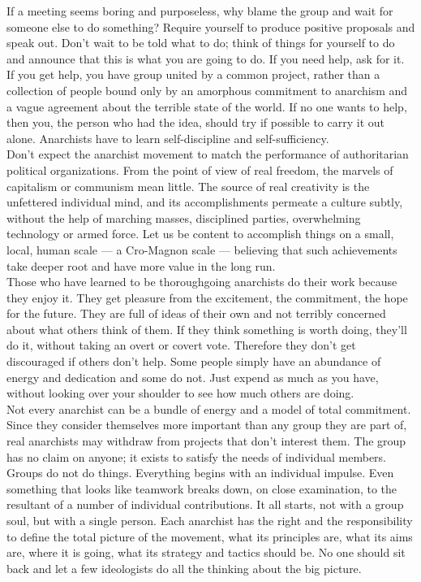 \documentclass[12pt, onecolumn, letterpaper, oneside]{book}
\begin{document}
If a meeting seems boring and purposeless, why blame the group and wait for someone else to do something? Require yourself to produce positive proposals and speak out. Don't wait to be told what to do; think of things for yourself to do and announce that this is what you are going to do. If you need help, ask for it. If you get help, you have group united by a common project, rather than a collection of people bound only by an amorphous commitment to anarchism and a vague agreement about the terrible state of the world. If no one wants to help, then you, the person who had the idea, should try if possible to carry it out alone. Anarchists have to learn self-discipline and self-sufficiency.\\
Don't expect the anarchist movement to match the performance of authoritarian political organizations. From the point of view of real freedom, the marvels of capitalism or communism mean little. The source of real creativity is the unfettered individual mind, and its accomplishments permeate a culture subtly, without the help of marching masses, disciplined parties, overwhelming technology or armed force. Let us be content to accomplish things on a small, local, human scale --- a Cro-Magnon scale --- believing that such achievements take deeper root and have more value in the long run.\\
Those who have learned to be thoroughgoing anarchists do their work because they enjoy it. They get pleasure from the excitement, the commitment, the hope for the future. They are full of ideas of their own and not terribly concerned about what others think of them. If they think something is worth doing, they'll do it, without taking an overt or covert vote. Therefore they don't get discouraged if others don't help. Some people simply have an abundance of energy and dedication and some do not. Just expend as much as you have, without looking over your shoulder to see how much others are doing.\\
Not every anarchist can be a bundle of energy and a model of total commitment. Since they consider themselves more important than any group they are part of, real anarchists may withdraw from projects that don't interest them. The group has no claim on anyone; it exists to satisfy the needs of individual members.\\
Groups do not do things. Everything begins with an individual impulse. Even something that looks like teamwork breaks down, on close examination, to the resultant of a number of individual contributions. It all starts, not with a group soul, but with a single person. Each anarchist has the right and the responsibility to define the total picture of the movement, what its principles are, what its aims are, where it is going, what its strategy and tactics should be. No one should sit back and let a few ideologists do all the thinking about the big picture.\\
\end{document}
